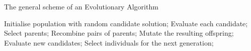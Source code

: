 \begin{algorithm}[H]
    \caption{The general scheme of an Evolutionary Algorithm}
    \begin{algorithmic}[1]
        \State Initialise population with random candidate solution;
        \State Evaluate each candidate;
            \State Select parents;
            \State Recombine pairs of parents;
            \State Mutate the resulting offspring;
            \State Evaluate new candidates;
            \State Select individuals for the next generation;
        \EndWhile

    \end{algorithmic}
    \label{algorithm:evolutionary}
\end{algorithm}
